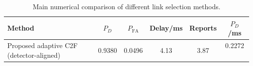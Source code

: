 \begin{table}[t]
    \centering
    \caption{Main numerical comparison of different link selection methods.}
    \label{tab:main_summary}
    \begin{tabular}{l c c c c c}
        \hline
        Method & $P_D$ & $P_{\mathrm{FA}}$ & Delay/ms & Reports & $P_D$/ms \\
        \hline
        Proposed adaptive C2F (detector-aligned) & 0.9380 & 0.0496 & 4.13 & 3.87 & 0.2272 \
        \hline
    \end{tabular}
\end{table}
